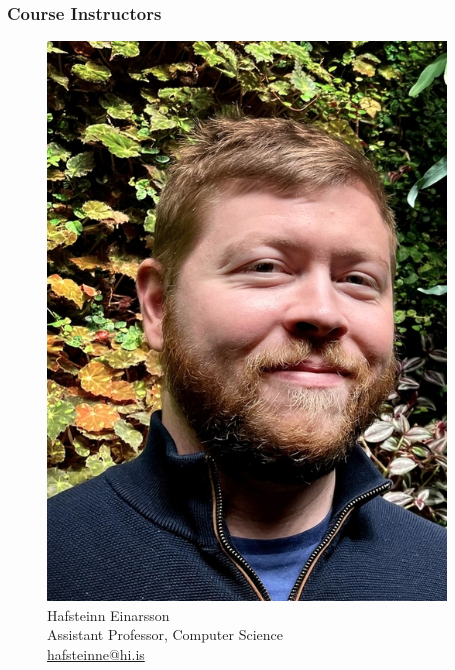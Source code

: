 \documentclass[
    NAME={Dr. Helga Ingimundardóttir},
    EMAIL={helgaingim@hi.is},
    FACULTY={Industrial Engineering},
    TITLE={Business Intelligence},
    SUBTITLE={Introduction},
    SEMINAR={IÐN610M},
    DATE={Spring, 2024}
]{HI-LaTeX/hi-beamer}
\begin{document}
    \begin{frame}
        \frametitle{Course Instructors}
        \begin{figure}
            \begin{minipage}[t]{0.3\textwidth}
                \centering
                \includegraphics[width=\linewidth]{figures/hafsteinne}
                Hafsteinn Einarsson \\
                Assistant Professor, Computer Science \\
                \url{hafsteinne@hi.is}
            \end{minipage}
            \hfill
            \begin{minipage}[t]{0.3\textwidth}
                \centering

\end{minipage}
\end{figure}
\end{frame}
\end{document}
